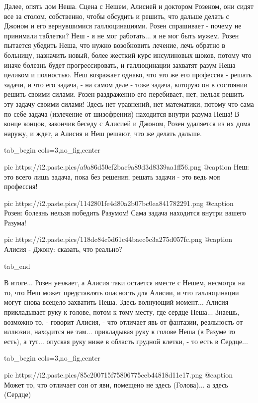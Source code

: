 Далее, опять дом Неша. Сцена с Нешем, Алисией и доктором Розеном, они сидят все
за столом, собственно, чтобы обсудить и решить, что дальше делать с Джоном и
его вернувшимися галлюцинациями. Розен спрашивает - почему не принимали
таблетки? Неш - я не мог работать...  я не мог быть мужем. Розен пытается
убедить Неша, что нужно возобновить лечение, лечь обратно в больницу, назначить
новый, более жесткий курс инсулиновых шоков, потому что иначе болезнь будет
прогрессировать, и галлюцинации захватят разум Неша целиком и полностью. Неш
возражает однако, что это же его профессия - решать задачи, и что его задача, -
на самом деле - тоже задача, которую он в состоянии решить своими силами. Розен
раздраженно его перебивает, нет, нельзя решить эту задачу своими силами! Здесь
нет уравнений, нет математики, потому что сама по себе задача (излечение от
шизофрении) находится внутри разума Неша!  В конце концов, закончив беседу с
Алисией и Джоном, Розен удаляется из их дома наружу, и ждет, а Алисия и Неш
решают, что же делать дальше. 

\ifcmt
  tab_begin cols=3,no_fig,center

     pic https://i2.paste.pics/a9a86d50ef2bac9a89d3d8339aa1ff56.png
		 @caption Неш: это всего лишь задача, пока без решения; решать задачи - это ведь моя профессия!

		 pic https://i2.paste.pics/1142801fe4d80a2b07bc0ea841782291.png
		 @caption Розен: болезнь нельзя победить Разумом! Сама задача находится внутри вашего Разума!

		 pic https://i2.paste.pics/118dc84c5d61c44baec5c3a275d057fc.png
		 @caption Алисия - Джону: сказать, что реально?

  tab_end
\fi

В итоге... Розен уезжает, а Алисия таки остается вместе с Нешем, несмотря на
то, что Неш может представлять опасность для Алисии, и что галлюцинации могут
снова всецело захватить Неша.  Здесь волнующий момент... Алисия прикладывает
руку к голове, потом к тому месту, где сердце Неша... Знаешь, возможно то, -
говорит Алисия, - что отличает явь от фантазии, реальность от иллюзии,
находится не там... прикладывая руку к голове Неша (в Разуме то есть), а тут...
опуская руку ниже в область грудной клетки, - то есть в Сердце... 

\ifcmt
  tab_begin cols=3,no_fig,center

		 pic https://i2.paste.pics/85c200715f75806775ceb44818d11e17.png
		 @caption Может то, что отличает сон от яви, помещено не здесь (Голова)... а здесь (Сердце)

